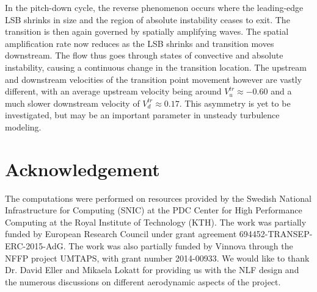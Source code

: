 In the pitch-down cycle, the reverse phenomenon occurs where the leading-edge LSB shrinks in size and the region of absolute instability ceases to exit. The transition is then again governed by spatially amplifying waves. The spatial amplification rate now reduces as the LSB shrinks and transition moves downstream. The flow thus goes through states of convective and absolute instability, causing a continuous change in the transition location. The upstream and downstream velocities of the transition point movement however are vastly different, with an average upstream velocity being around $V^{tr}_{u}\approx-0.60$ and a much slower downstream velocity of $V^{tr}_{d}\approx0.17$. This asymmetry is yet to be investigated, but may be an important parameter in unsteady turbulence modeling.

\section*{Acknowledgement} 

The computations were performed on resources provided by the Swedish National Infrastructure for Computing (SNIC) at the PDC Center for High Performance Computing at the Royal Institute of Technology (KTH). The work was partially funded by European Research Council under grant agreement 694452-TRANSEP-ERC-2015-AdG. The work was also partially funded by Vinnova through the NFFP project UMTAPS, with grant number 2014-00933. We would like to thank Dr. David Eller and Mikaela Lokatt for providing us with the NLF design and the numerous discussions on different aerodynamic aspects of the project.



%
%



%
